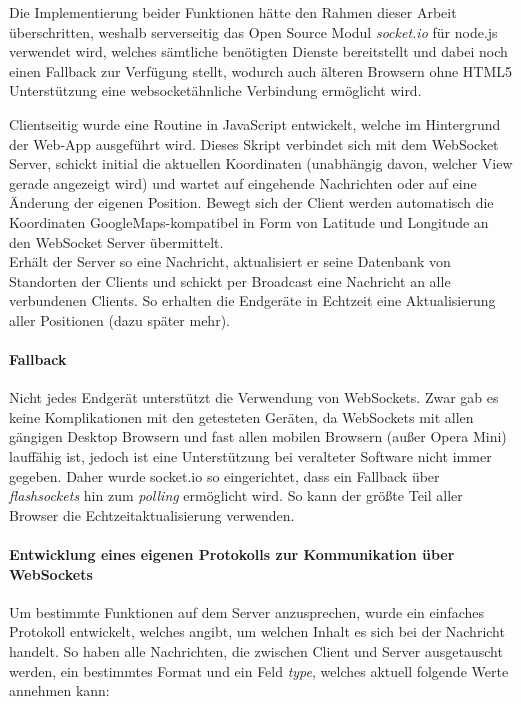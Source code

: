 Die Implementierung beider Funktionen hätte den Rahmen dieser Arbeit überschritten, weshalb serverseitig das Open Source Modul \emph{socket.io} \cite{socket.io} für node.js verwendet wird, welches sämtliche benötigten Dienste bereitstellt und dabei noch einen Fallback zur Verfügung stellt, wodurch auch älteren Browsern ohne HTML5 Unterstützung eine websocketähnliche Verbindung ermöglicht wird.\par

Clientseitig wurde eine Routine in JavaScript entwickelt, welche im Hintergrund der Web-App ausgeführt wird. Dieses Skript verbindet sich mit dem WebSocket Server, schickt initial die aktuellen Koordinaten (unabhängig davon, welcher View gerade angezeigt wird) und wartet auf eingehende Nachrichten oder auf eine Änderung der eigenen Position. Bewegt sich der Client werden automatisch die Koordinaten GoogleMaps-kompatibel in Form von Latitude und Longitude an den WebSocket Server übermittelt.\\
Erhält der Server so eine Nachricht, aktualisiert er seine Datenbank von Standorten der Clients und schickt per Broadcast eine Nachricht an alle verbundenen Clients. So erhalten die Endgeräte in Echtzeit eine Aktualisierung aller Positionen (dazu später mehr).

\paragraph{Fallback}
Nicht jedes Endgerät unterstützt die Verwendung von WebSockets. Zwar gab es keine Komplikationen mit den getesteten Geräten, da WebSockets mit allen gängigen Desktop Browsern und fast allen mobilen Browsern (außer Opera Mini) lauffähig ist, jedoch ist eine Unterstützung bei veralteter Software nicht immer gegeben. Daher wurde socket.io so eingerichtet, dass ein Fallback über \emph{flashsockets} hin zum \emph{polling} ermöglicht wird. So kann der größte Teil aller Browser die Echtzeitaktualisierung verwenden.

\paragraph{Entwicklung eines eigenen Protokolls zur Kommunikation über WebSockets}
Um bestimmte Funktionen auf dem Server anzusprechen, wurde ein einfaches Protokoll entwickelt, welches angibt, um welchen Inhalt es sich bei der Nachricht handelt. So haben alle Nachrichten, die zwischen Client und Server ausgetauscht werden, ein bestimmtes Format und ein Feld \emph{type}, welches aktuell folgende Werte annehmen kann:

